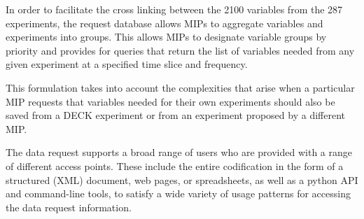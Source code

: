\documentclass[gmd,manuscript]{copernicus}
\begin{document}


In order to facilitate the cross linking between the 2100 variables
from the 287 experiments, the request database allows MIPs to
aggregate variables and experiments into groups. This allows MIPs to
designate variable groups by priority and provides for queries that
return the list of variables needed from any given experiment at a
specified time slice and frequency.


This formulation takes into account the complexities that arise when a
particular MIP requests that variables needed for their own
experiments should also be saved from a DECK experiment or from an
experiment proposed by a different MIP.

The data request supports a broad range of users who are provided with
a range of different access points. These include the entire
codification in the form of a structured (XML) document, web pages, or
spreadsheets, as well as a python API and command-line tools, to
satisfy a wide variety of usage patterns for accessing the data
request information.

\end{document}
